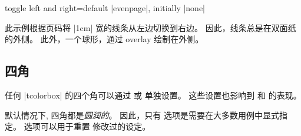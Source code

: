 \begin{docTcbKey}[][doc updated=2017-02-16]{toggle left and right}{=}{default |evenpage|, initially |none|}

此示例根据页码将 |1cm| 宽的线条从左边切换到右边。
因此，线条总是在双面纸的外侧。
此外，一个球形，通过 overlay 绘制在外侧。
\bigskip

\tcbusetemp
\end{docTcbKey}




\subsection{四角}\label{subsec:corners}


任何 |tcolorbox| 的四个角可以通过  或  单独设置。
这些设置也影响到  和  的表现。


默认情况下, 四角都是\emph{圆润的}。 因此，只有
 选项是需要在大多数用例中显式指定。
 选项可以用于重置 
修改过的设定。


